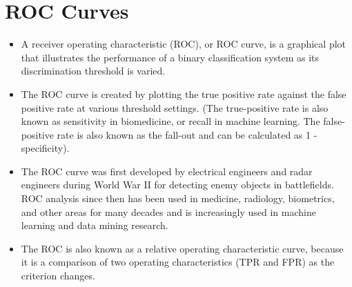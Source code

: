 \documentclass[]{report}
\begin{document}
\section*{ROC Curves}
\begin{itemize}
	\item A receiver operating characteristic (ROC), or ROC curve, is a graphical plot that illustrates the performance of a binary classification system as its discrimination threshold is varied.
	\item  The ROC curve is created by plotting the true positive rate against the false positive rate at various threshold settings. (The true-positive rate is also known as sensitivity in biomedicine, or recall in machine learning. The false-positive rate is also known as the fall-out and can be calculated as 1 - specificity). 
	
	
	
%	
	
	\item The ROC curve was first developed by electrical engineers and radar engineers during World War II for detecting enemy objects in battlefields. ROC analysis since then has been used in medicine, radiology, biometrics, and other areas for many decades and is increasingly used in machine learning and data mining research.
\item 
	The ROC is also known as a relative operating characteristic curve, because it is a comparison of two operating characteristics (TPR and FPR) as the criterion changes.
	
\end{itemize}

\end{document}
